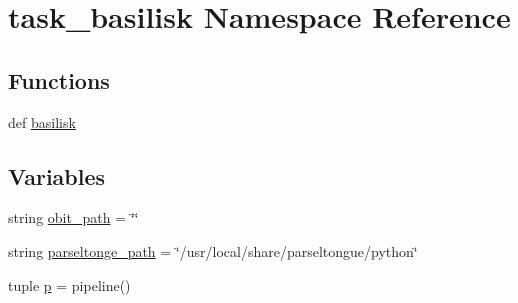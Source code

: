 \hypertarget{namespacetask__basilisk}{\section{task\-\_\-basilisk \-Namespace \-Reference}
\label{namespacetask__basilisk}
}
\subsection*{\-Functions}
\begin{DoxyCompactItemize}
\item 
def \hyperlink{namespacetask__basilisk_a261d2cf10191345af28b32194c2163c0}{basilisk}
\end{DoxyCompactItemize}
\subsection*{\-Variables}
\begin{DoxyCompactItemize}
\item 
string \hyperlink{namespacetask__basilisk_aed0c6d1cc698b489fcaf1af9b94d8654}{obit\-\_\-path} = \char`\"{}\char`\"{}
\item 
string \hyperlink{namespacetask__basilisk_a898b155fdd6a35d9738b02167102d6e0}{parseltonge\-\_\-path} = \char`\"{}/usr/local/share/parseltongue/python\char`\"{}
\item 
tuple \hyperlink{namespacetask__basilisk_a50730ce96c7f9275aecc19e75bf4a7bf}{p} = pipeline()
\end{DoxyCompactItemize}


